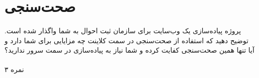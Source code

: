\documentclass[../main.tex]{subfiles}
\begin{document}
\section{صحت‌سنجی}

\paragraph{}
پروژه پیاده‌سازی یک وب‌سایت برای سازمان ثبت احوال به شما واگذار شده است.
توضیح دهید که استفاده از صحت‌سنجی در سمت کلاینت چه مزایایی برای شما دارد و آیا تنها همین صحت‌سنجی کفایت کرده و شما نیاز به پیاده‌سازی در سمت سرور ندارید؟

\paragraph{}
۳ نمره

\end{document}
